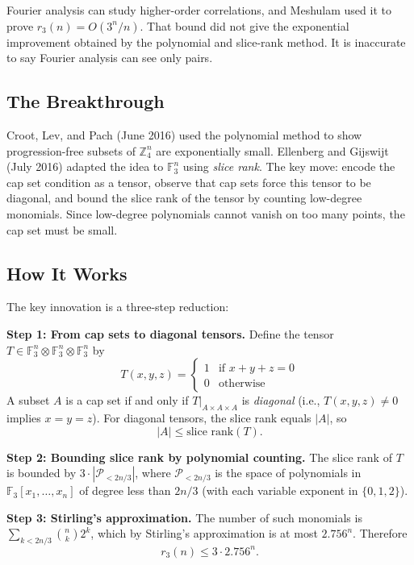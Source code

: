 Fourier analysis can study higher-order correlations, and Meshulam used it to prove $r_3(n)=O(3^n/n)$. That bound did not give the exponential improvement obtained by the polynomial and slice-rank method. It is inaccurate to say Fourier analysis can see only pairs.

\subsection{The Breakthrough}

Croot, Lev, and Pach (June 2016) used the polynomial method to show progression-free subsets of $\mathbb{Z}_4^n$ are exponentially small. Ellenberg and Gijswijt (July 2016) adapted the idea to $\mathbb{F}_3^n$ using \emph{slice rank}. The key move: encode the cap set condition as a tensor, observe that cap sets force this tensor to be diagonal, and bound the slice rank of the tensor by counting low-degree monomials. Since low-degree polynomials cannot vanish on too many points, the cap set must be small.

\subsection{How It Works}

The key innovation is a three-step reduction:

\textbf{Step 1: From cap sets to diagonal tensors.} Define the tensor $T \in \mathbb{F}_3^n \otimes \mathbb{F}_3^n \otimes \mathbb{F}_3^n$ by
\[
T(x,y,z) = \begin{cases} 1 & \text{if } x + y + z = 0 \\ 0 & \text{otherwise} \end{cases}
\]
A subset $A$ is a cap set if and only if $T|_{A \times A \times A}$ is \emph{diagonal} (i.e., $T(x,y,z) \neq 0$ implies $x = y = z$). For diagonal tensors, the slice rank equals $|A|$, so
\[
|A| \le \text{slice rank}(T).
\]

\textbf{Step 2: Bounding slice rank by polynomial counting.} The slice rank of $T$ is bounded by $3 \cdot |\mathcal{P}_{<2n/3}|$, where $\mathcal{P}_{<2n/3}$ is the space of polynomials in $\mathbb{F}_3[x_1, \ldots, x_n]$ of degree less than $2n/3$ (with each variable exponent in $\{0,1,2\}$).

\textbf{Step 3: Stirling's approximation.} The number of such monomials is $\sum_{k < 2n/3} \binom{n}{k} 2^k$, which by Stirling's approximation is at most $2.756^n$. Therefore
\[
r_3(n) \le 3 \cdot 2.756^n.
\]

